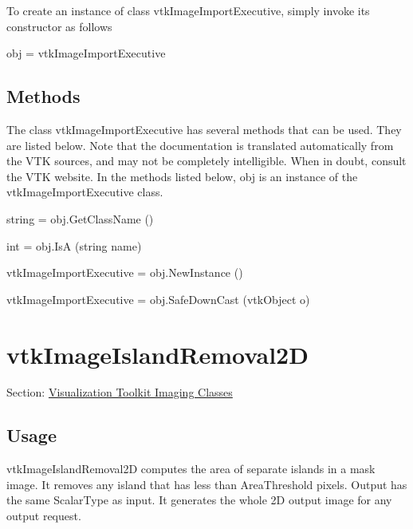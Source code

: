 To create an instance of class vtk\-Image\-Import\-Executive, simply invoke its constructor as follows \begin{DoxyVerb}  obj = vtkImageImportExecutive
\end{DoxyVerb}
 \hypertarget{vtkwidgets_vtkxyplotwidget_Methods}{}\subsection{Methods}\label{vtkwidgets_vtkxyplotwidget_Methods}
The class vtk\-Image\-Import\-Executive has several methods that can be used. They are listed below. Note that the documentation is translated automatically from the V\-T\-K sources, and may not be completely intelligible. When in doubt, consult the V\-T\-K website. In the methods listed below, {\ttfamily obj} is an instance of the vtk\-Image\-Import\-Executive class. 
\begin{DoxyItemize}
\item {\ttfamily string = obj.\-Get\-Class\-Name ()}  
\item {\ttfamily int = obj.\-Is\-A (string name)}  
\item {\ttfamily vtk\-Image\-Import\-Executive = obj.\-New\-Instance ()}  
\item {\ttfamily vtk\-Image\-Import\-Executive = obj.\-Safe\-Down\-Cast (vtk\-Object o)}  
\end{DoxyItemize}\hypertarget{vtkimaging_vtkimageislandremoval2d}{}\section{vtk\-Image\-Island\-Removal2\-D}\label{vtkimaging_vtkimageislandremoval2d}
Section\-: \hyperlink{sec_vtkimaging}{Visualization Toolkit Imaging Classes} \hypertarget{vtkwidgets_vtkxyplotwidget_Usage}{}\subsection{Usage}\label{vtkwidgets_vtkxyplotwidget_Usage}
vtk\-Image\-Island\-Removal2\-D computes the area of separate islands in a mask image. It removes any island that has less than Area\-Threshold pixels. Output has the same Scalar\-Type as input. It generates the whole 2\-D output image for any output request.

